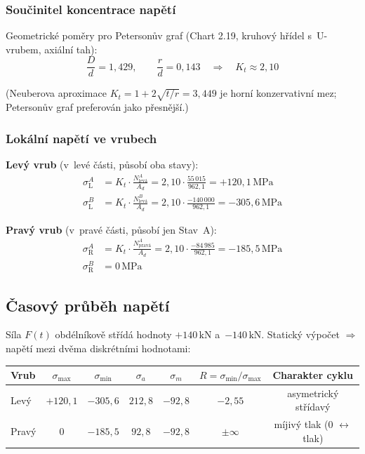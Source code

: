\documentclass[a4paper,11pt]{article}
\newcommand{\unit}[1]{\,\mathrm{#1}}
\begin{document}
\subsubsection{Součinitel koncentrace napětí}

Geometrické poměry pro Petersonův graf (Chart 2.19, kruhový hřídel s~U-vrubem, axiální tah):
\begin{equation}
    \frac{D}{d} = 1{,}429, \qquad \frac{r}{d} = 0{,}143 \quad\Rightarrow\quad \boxed{K_t \approx 2{,}10}
\end{equation}

(Neuberova aproximace $K_t = 1 + 2\sqrt{t/r} = 3{,}449$ je horní konzervativní mez; Petersonův graf preferován jako přesnější.)

\subsubsection{Lokální napětí ve vrubech}

\textbf{Levý vrub} (v~levé části, působí oba stavy):
\begin{align}
    \sigma_{\mathrm{L}}^A &= K_t \cdot \frac{N_{\mathrm{levá}}^A}{A_d} = 2{,}10 \cdot \frac{55\,015}{962{,}1} = \boxed{+120{,}1\unit{MPa}} \\
    \sigma_{\mathrm{L}}^B &= K_t \cdot \frac{N_{\mathrm{levá}}^B}{A_d} = 2{,}10 \cdot \frac{-140\,000}{962{,}1} = \boxed{-305{,}6\unit{MPa}}
\end{align}

\textbf{Pravý vrub} (v~pravé části, působí jen Stav~A):
\begin{align}
    \sigma_{\mathrm{R}}^A &= K_t \cdot \frac{N_{\mathrm{pravá}}^A}{A_d} = 2{,}10 \cdot \frac{-84\,985}{962{,}1} = \boxed{-185{,}5\unit{MPa}} \\
    \sigma_{\mathrm{R}}^B &= 0\unit{MPa}
\end{align}

\subsection{Časový průběh napětí}

Síla $F(t)$ obdélníkově střídá hodnoty $+140\unit{kN}$ a~$-140\unit{kN}$. Statický výpočet $\Rightarrow$ napětí mezi dvěma diskrétními hodnotami:

\begin{center}
\begin{tabular}{lcccccc}
\toprule
\textbf{Vrub} & $\sigma_{\max}$ & $\sigma_{\min}$ & $\sigma_a$ & $\sigma_m$ & $R = \sigma_{\min}/\sigma_{\max}$ & \textbf{Charakter cyklu} \\
\midrule
Levý  & $+120{,}1$ & $-305{,}6$ & $212{,}8$ & $-92{,}8$ & $-2{,}55$ & asymetrický střídavý \\
Pravý & $0$        & $-185{,}5$ & $92{,}8$  & $-92{,}8$ & $\pm\infty$ & míjivý tlak (0 $\leftrightarrow$ tlak) \\
\bottomrule
\end{tabular}
\end{center}
\end{document}
